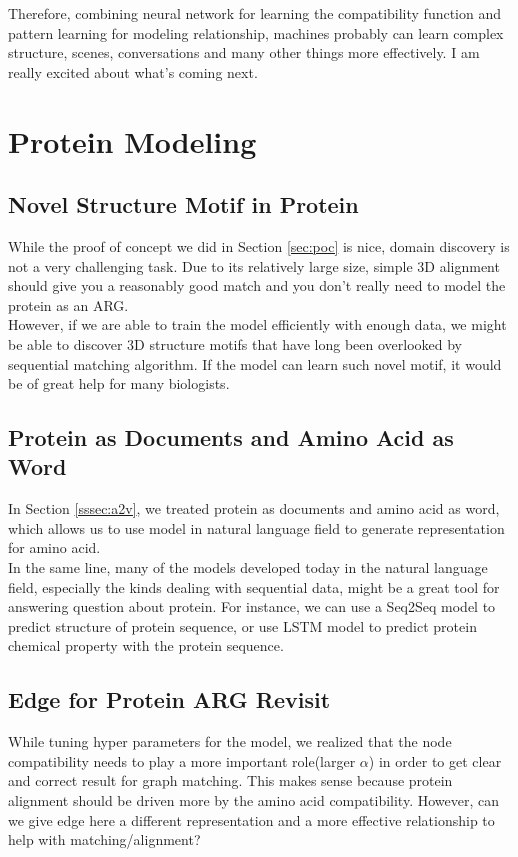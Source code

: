 Therefore, combining neural network for learning the compatibility function and pattern learning for modeling relationship, machines probably can learn complex structure, scenes, conversations and many other things more effectively. I am really excited about what's coming next.

\section{Protein Modeling}

\subsection{Novel Structure Motif in Protein}

While the proof of concept we did in Section \ref{sec:poc} is nice, domain discovery is not a very challenging task. Due to its relatively large size, simple 3D alignment should give you a reasonably good match and you don't really need to model the protein as an ARG.\\

However, if we are able to train the model efficiently with enough data, we might be able to discover 3D structure motifs that have long been overlooked by sequential matching algorithm. If the model can learn such novel motif, it would be of great help for many biologists.

\subsection{Protein as Documents and Amino Acid as Word}

In Section \ref{sssec:a2v}, we treated protein as documents and amino acid as word, which allows us to use model in natural language field to generate representation for amino acid.\\

In the same line, many of the models developed today in the natural language field, especially the kinds dealing with sequential data, might be a great tool for answering question about protein. For instance, we can use a Seq2Seq model to predict structure of protein sequence, or use LSTM model to predict protein chemical property with the protein sequence.


\subsection{Edge for Protein ARG Revisit}

While tuning hyper parameters for the model, we realized that the node compatibility needs to play a more important role(larger $\alpha$) in order to get clear and correct result for graph matching. This makes sense because protein alignment should be driven more by the amino acid compatibility. However, can we give edge here a different representation and a more effective relationship to help with matching/alignment?


